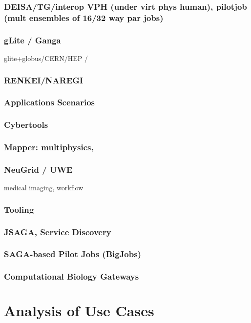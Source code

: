 \documentclass[12pt]{article}
\begin{document}
\subsubsection*{DEISA/TG/interop VPH (under virt phys human), pilotjob
                  (mult ensembles of 16/32 way par jobs)}
 \subsubsection*{gLite / Ganga} glite+globus/CERN/HEP /
 \subsubsection*{RENKEI/NAREGI}

\subsubsection{Applications Scenarios}
\subsubsection*{Cybertools} 
\subsubsection*{Mapper: multiphysics,}
\subsubsection*{NeuGrid / UWE} medical imaging, workflow

\subsubsection{Tooling}
   \subsubsection*{JSAGA, Service Discovery}
   \subsubsection*{SAGA-based Pilot Jobs (BigJobs)}
   \subsubsection*{Computational Biology Gateways}

\section{Analysis of Use Cases}
\end{document}
